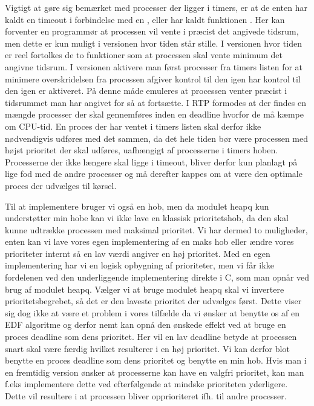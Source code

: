 Vigtigt at gøre sig bemærket med processer der ligger i timers, er at de enten har kaldt en timeout i forbindelse med en , eller har kaldt funktionen  . Her kan forventer en programmør at processen vil vente i præcist det angivede tidsrum, men dette er kun  muligt i \des versionen hvor tiden står stille. I versionen hvor tiden er reel fortolkes de to funktioner som at processen skal vente  minimum det angivne tidsrum. I  versionen  aktivere man  først processer fra timers listen for at minimere overskridelsen fra processen afgiver kontrol til den igen har kontrol til den igen er aktiveret. På denne måde emuleres at processen venter præcist i tidsrummet man har angivet for så at fortsætte. I RTP formodes at der findes en mængde processer der skal gennemføres inden en deadline hvorfor de må kæmpe om CPU-tid. En proces der har ventet i timers listen skal derfor ikke nødvendigvis udføres med det sammen, da det hele tiden bør være processen med højst prioritet der skal udføres, uafhængigt af processerne i timers hoben. Processerne der ikke længere skal ligge i timeout, bliver derfor kun planlagt på lige fod med de andre processer og må derefter kappes om at være den optimale proces der udvælges til kørsel.

Til at implementere  bruger vi også en hob, men da modulet heapq  kun understøtter min hobe kan vi ikke lave en klassisk prioritetshob, da den skal kunne udtrække processen med maksimal prioritet. Vi har dermed to muligheder, enten kan vi lave vores egen implementering af en maks hob eller ændre vores prioriteter internt så en lav værdi angiver en høj prioritet. Med en egen implementering har vi en  logisk opbygning af prioriteter, men vi får ikke fordelenen ved den underliggende implementering  direkte i C, som man opnår ved brug af modulet heapq. Vælger vi at bruge modulet heapq skal vi invertere prioritetsbegrebet, så det er den laveste prioritet der udvælges først. Dette viser  sig dog ikke at være et problem  i vores tilfælde da vi ønsker at benytte os af en EDF algoritme og derfor nemt kan opnå den ønskede effekt ved at bruge en proces deadline som dens prioritet. Her vil en lav deadline betyde at processen snart skal være færdig hvilket resulterer i en høj prioritet.
Vi kan derfor blot benytte en proces deadline som dens prioritet og benytte en min hob. Hvis man i en fremtidig version ønsker at processerne kan have en valgfri prioritet, kan man f.eks implementere dette ved efterfølgende at mindske prioriteten yderligere. Dette vil resultere i at processen bliver opprioriteret ifh. til andre processer.

